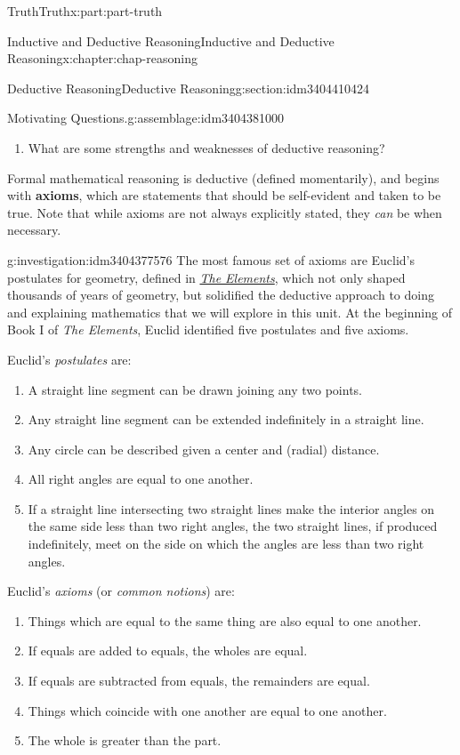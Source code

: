 \documentclass[oneside,10pt,]{book}
\newcommand{\terminology}[1]{\textbf{#1}}
\numberwithin{equation}{section}
\begin{document}
\begin{partptx}{Truth}{}{Truth}{}{}{x:part:part-truth}
\begin{chapterptx}{Inductive and Deductive Reasoning}{}{Inductive and Deductive Reasoning}{}{}{x:chapter:chap-reasoning}
\begin{sectionptx}{Deductive Reasoning}{}{Deductive Reasoning}{}{}{g:section:idm3404410424}
\begin{assemblage}{Motivating Questions.}{g:assemblage:idm3404381000}
\begin{enumerate}
\item{}What are some strengths and weaknesses of deductive reasoning?%
\end{enumerate}
%
\end{assemblage}
Formal mathematical reasoning is deductive (defined momentarily), and begins with \terminology{axioms}, which are statements that should be self-evident and taken to be true. Note that while axioms are not always explicitly stated, they \emph{can} be when necessary.%
\begin{investigation}{}{g:investigation:idm3404377576}%
The most famous set of axioms are Euclid's postulates for geometry, defined in \emph{\href{https://en.wikipedia.org/wiki/Euclid's_Elements}{The Elements}}, which not only shaped thousands of years of geometry, but solidified the deductive approach to doing and explaining mathematics that we will explore in this unit. At the beginning of Book I of \emph{The Elements}, Euclid identified five postulates and five axioms.%
\par
Euclid's \emph{postulates} are:%
%
\begin{enumerate}
\item{}A straight line segment can be drawn joining any two points.%
\item{}Any straight line segment can be extended indefinitely in a straight line.%
\item{}Any circle can be described given a center and (radial) distance.%
\item{}All right angles are equal to one another.%
\item{}If a straight line intersecting two straight lines make the interior angles on the same side less than two right angles, the two straight lines, if produced indefinitely, meet on the side on which the angles are less than two right angles.%
\end{enumerate}
Euclid's \emph{axioms} (or \emph{common notions}) are:%
%
\begin{enumerate}
\item{}Things which are equal to the same thing are also equal to one another.%
\item{}If equals are added to equals, the wholes are equal.%
\item{}If equals are subtracted from equals, the remainders are equal.%
\item{}Things which coincide with one another are equal to one another.%
\item{}The whole is greater than the part.%
\end{enumerate}

\end{investigation}
\end{sectionptx}
\end{chapterptx}
\end{partptx}
\end{document}
